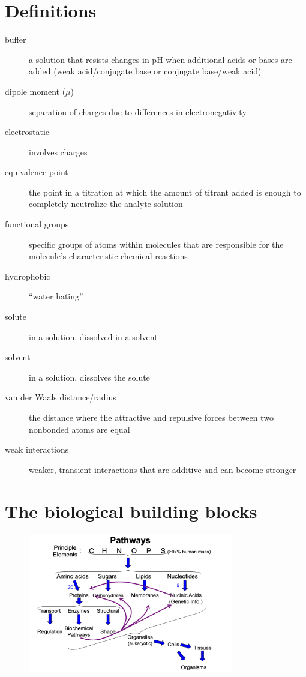 \documentclass[letterpaper, 12pt]{article}
\begin{document}
\newpage

\section*{Definitions}
\label{defs}

\begin{description}
\item [buffer] a solution that resists changes in pH when additional acids or bases are added (weak acid/conjugate base or conjugate base/weak acid)
\item [dipole moment ($\mu$)] separation of charges due to differences in electronegativity
\item [electrostatic] involves charges
\item [equivalence point] the point in a titration at which the amount of titrant added is enough to completely neutralize the analyte solution
\item [functional groups] specific groups of atoms within molecules that are responsible for the molecule's characteristic chemical reactions
\item [hydrophobic] ``water hating''
\item [solute] in a solution, dissolved in a solvent
\item [solvent] in a solution, dissolves the solute
\item [van der Waals distance/radius] the distance where the attractive and repulsive forces between two nonbonded atoms are equal
\item [weak interactions] weaker, transient interactions that are additive and can become stronger
\end{description}

\newpage

\section*{The biological building blocks}

\begin{figure}[H]
\centering
\includegraphics[width=0.8\textwidth]{pathways}
\end{figure}
\end{document}
